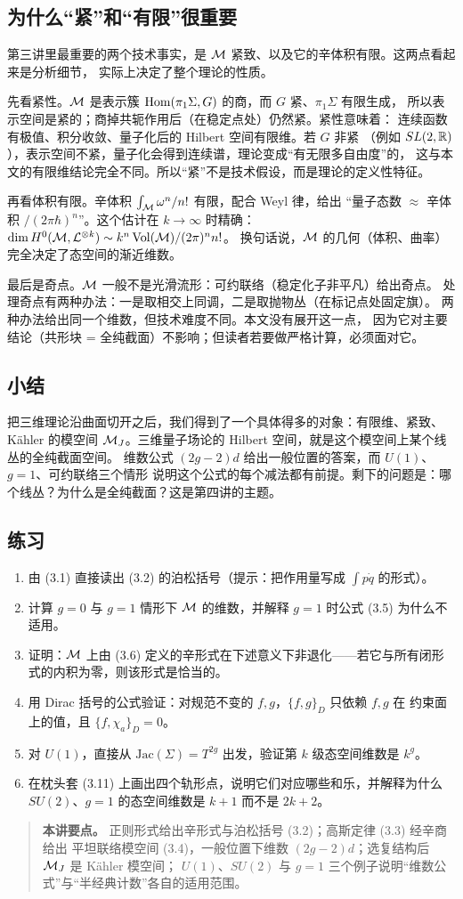 \subsection{为什么“紧”和“有限”很重要}

第三讲里最重要的两个技术事实，是 $\mathcal{M}$ 紧致、以及它的辛体积有限。这两点看起来是分析细节，
实际上决定了整个理论的性质。

先看紧性。$\mathcal{M}$ 是表示簇 $\operatorname{Hom}(\pi_1\Sigma,G)$ 的商，而 $G$ 紧、$\pi_1\Sigma$ 有限生成，
所以表示空间是紧的；商掉共轭作用后（在稳定点处）仍然紧。紧性意味着：
连续函数有极值、积分收敛、量子化后的 Hilbert 空间有限维。若 $G$ 非紧
（例如 $SL(2,\mathbb{R})$），表示空间不紧，量子化会得到连续谱，理论变成“有无限多自由度”的，
这与本文的有限维结论完全不同。所以“紧”不是技术假设，而是理论的定义性特征。

再看体积有限。辛体积 $\int_{\mathcal{M}} \omega^n/n!$ 有限，配合 Weyl 律，给出
“量子态数 $\approx$ 辛体积 $/(2\pi\hbar)^n$”。这个估计在 $k\to\infty$ 时精确：
$\dim H^0(\mathcal{M},\mathcal{L}^{\otimes k})\sim k^n\,\mathrm{Vol}(\mathcal{M})/(2\pi)^n n!$。
换句话说，$\mathcal{M}$ 的几何（体积、曲率）完全决定了态空间的渐近维数。

最后是奇点。$\mathcal{M}$ 一般不是光滑流形：可约联络（稳定化子非平凡）给出奇点。
处理奇点有两种办法：一是取相交上同调，二是取抛物丛（在标记点处固定旗）。
两种办法给出同一个维数，但技术难度不同。本文没有展开这一点，
因为它对主要结论（共形块 = 全纯截面）不影响；但读者若要做严格计算，必须面对它。

\subsection{小结}

把三维理论沿曲面切开之后，我们得到了一个具体得多的对象：有限维、紧致、Kähler 的模空间
$\mathcal{M}_J$。三维量子场论的 Hilbert 空间，就是这个模空间上某个线丛的全纯截面空间。
维数公式 $(2g-2)d$ 给出一般位置的答案，而 $U(1)$、$g=1$、可约联络三个情形
说明这个公式的每个减法都有前提。剩下的问题是：哪个线丛？为什么是全纯截面？这是第四讲的主题。

\subsection*{练习}
\begin{enumerate}[leftmargin=*]
  \item 由 (3.1) 直接读出 (3.2) 的泊松括号（提示：把作用量写成 $\int p\dot q$ 的形式）。
  \item 计算 $g=0$ 与 $g=1$ 情形下 $\mathcal{M}$ 的维数，并解释 $g=1$ 时公式 (3.5) 为什么不适用。
  \item 证明：$\mathcal{M}$ 上由 (3.6) 定义的辛形式在下述意义下非退化——若它与所有闭形式的内积为零，则该形式是恰当的。
  \item 用 Dirac 括号的公式验证：对规范不变的 $f,g$，$\{f,g\}_D$ 只依赖 $f,g$ 在
        约束面上的值，且 $\{f,\chi_a\}_D=0$。
  \item 对 $U(1)$，直接从 $\mathrm{Jac}(\Sigma)=T^{2g}$ 出发，验证第 $k$ 级态空间维数是 $k^g$。
  \item 在枕头套 (3.11) 上画出四个轨形点，说明它们对应哪些和乐，并解释为什么
        $SU(2)$、$g=1$ 的态空间维数是 $k+1$ 而不是 $2k+2$。
\end{enumerate}

\begin{quote}
\small
\textbf{本讲要点。} 正则形式给出辛形式与泊松括号 (3.2)；高斯定律 (3.3) 经辛商给出
平坦联络模空间 (3.4)，一般位置下维数 $(2g-2)d$；选复结构后 $\mathcal{M}_J$ 是 Kähler 模空间；
$U(1)$、$SU(2)$ 与 $g=1$ 三个例子说明“维数公式”与“半经典计数”各自的适用范围。
\end{quote}
